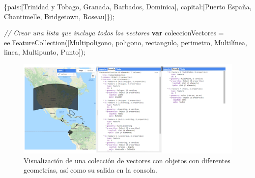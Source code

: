 \documentclass[
  12pt,
  letterpaper,
  twoside]{book}
\newenvironment{Shaded}{\begin{snugshade}}{\end{snugshade}}
\newcommand{\CommentTok}[1]{\textcolor[rgb]{0.24,0.58,0.00}{\textit{#1}}}
\newcommand{\ControlFlowTok}[1]{\textcolor[rgb]{0.00,0.00,0.00}{\textbf{#1}}}
\newcommand{\DataTypeTok}[1]{\textcolor[rgb]{0.00,0.00,0.00}{#1}}
\newcommand{\FunctionTok}[1]{\textcolor[rgb]{0.48,0.12,0.64}{#1}}
\newcommand{\KeywordTok}[1]{\textcolor[rgb]{0.48,0.12,0.64}{#1}}
\newcommand{\NormalTok}[1]{#1}
\newcommand{\OperatorTok}[1]{\textcolor[rgb]{0.00,0.00,0.00}{#1}}
\newcommand{\StringTok}[1]{\textcolor[rgb]{0.87,0.29,0.22}{#1}}
\begin{document}
\begin{Shaded}
\begin{Highlighting}[]
\NormalTok{                  \{}\DataTypeTok{pais}\OperatorTok{:}\NormalTok{[}\StringTok{\textquotesingle{}Trinidad y Tobago\textquotesingle{}}\OperatorTok{,}
                    \StringTok{\textquotesingle{}Granada\textquotesingle{}}\OperatorTok{,}
                    \StringTok{\textquotesingle{}Barbados\textquotesingle{}}\OperatorTok{,}
                    \StringTok{\textquotesingle{}Dominica\textquotesingle{}}\NormalTok{]}\OperatorTok{,}
                  \DataTypeTok{capital}\OperatorTok{:}\NormalTok{[}\StringTok{\textquotesingle{}Puerto España\textquotesingle{}}\OperatorTok{,}
                    \StringTok{\textquotesingle{}Chantimelle\textquotesingle{}}\OperatorTok{,}
                    \StringTok{\textquotesingle{}Bridgetown\textquotesingle{}}\OperatorTok{,}
                    \StringTok{\textquotesingle{}Roseau\textquotesingle{}}\NormalTok{]\})}\OperatorTok{;}
\end{Highlighting}
\end{Shaded}

\begin{Shaded}
\begin{Highlighting}[]
\CommentTok{// Crear una lista que incluya todos los vectores}
\ControlFlowTok{var}\NormalTok{ coleccionVectores }\OperatorTok{=} \KeywordTok{ee}\OperatorTok{.}\FunctionTok{FeatureCollection}\NormalTok{([Multipoligono}\OperatorTok{,}
\NormalTok{  poligono}\OperatorTok{,}
\NormalTok{  rectangulo}\OperatorTok{,}
\NormalTok{  perimetro}\OperatorTok{,}
\NormalTok{  Multilínea}\OperatorTok{,}
\NormalTok{  linea}\OperatorTok{,}
\NormalTok{  Multipunto}\OperatorTok{,}
\NormalTok{  Punto])}\OperatorTok{;}
\end{Highlighting}
\end{Shaded}

\begin{figure}[H]

{\centering \includegraphics[width=0.95\linewidth]{Img/ej16} 

}

\caption{Visualización de una colección de vectores con objetos con diferentes geometrías, así como su salida en la consola.}\label{fig:f84}
\end{figure}
\end{document}
